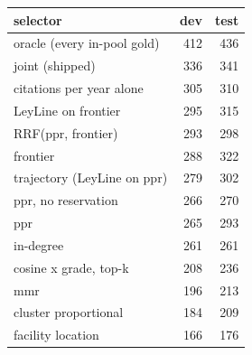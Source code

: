 \begin{tabular}{lrr}
\toprule
selector & dev & test \\
\midrule
oracle (every in-pool gold) & 412 & 436 \\
joint (shipped) & 336 & 341 \\
citations per year alone & 305 & 310 \\
LeyLine on frontier & 295 & 315 \\
RRF(ppr, frontier) & 293 & 298 \\
frontier & 288 & 322 \\
trajectory (LeyLine on ppr) & 279 & 302 \\
ppr, no reservation & 266 & 270 \\
ppr & 265 & 293 \\
in-degree & 261 & 261 \\
cosine x grade, top-k & 208 & 236 \\
mmr & 196 & 213 \\
cluster proportional & 184 & 209 \\
facility location & 166 & 176 \\
\bottomrule
\end{tabular}
